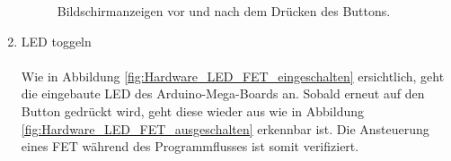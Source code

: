 \begin{enumerate}
\begin{figure}[h!]
\centering
{}
\hfill
{}
\hfill
\caption{Bildschirmanzeigen vor und nach dem Drücken des Buttons.}
\label{fig:Hardware_Text_Bild}
\end{figure}
\newpage

\item LED toggeln\\
\\
Wie in Abbildung \ref{fig:Hardware_LED_FET_eingeschalten} ersichtlich, geht die eingebaute LED des Arduino-Mega-Boards an. Sobald erneut auf den Button gedrückt wird, geht diese wieder aus wie in Abbildung \ref{fig:Hardware_LED_FET_ausgeschalten} erkennbar ist. Die Ansteuerung eines FET während des Programmflusses ist somit verifiziert.

\begin{figure}[h!]
\centering
{}
\hfill
{}
\hfill
\caption{}
\label{fig:Hardware_LED_1}
\end{figure}
\end{enumerate}

